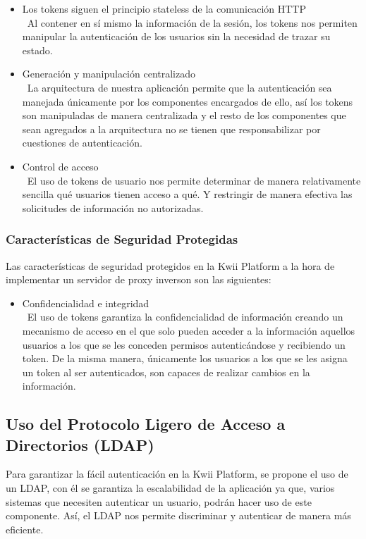 \begin{itemize}
    \item Los tokens siguen el principio stateless de la comunicación HTTP\\\
    Al contener en sí mismo la información de la sesión, los tokens nos permiten manipular la autenticación de los usuarios sin la necesidad de trazar su estado.
    \item Generación y manipulación centralizado\\\
    La arquitectura de nuestra aplicación permite que la autenticación sea manejada únicamente por los componentes encargados de ello, así los tokens son manipuladas de manera centralizada y el resto de los componentes que sean agregados a la arquitectura no se tienen que responsabilizar por cuestiones de autenticación.
    \item Control de acceso\\\
    El uso de tokens de usuario nos permite determinar de manera relativamente sencilla qué usuarios tienen acceso a qué. Y restringir de manera efectiva las solicitudes de información no autorizadas.
\end{itemize}

\subsubsection{Características de Seguridad Protegidas}
Las características de seguridad protegidos en la Kwii Platform a la hora de implementar un servidor de proxy inverson son las siguientes:
\begin{itemize}
    \item Confidencialidad e integridad\\\
    El uso de tokens garantiza la confidencialidad de información creando un mecanismo de acceso en el que solo pueden acceder a la información aquellos usuarios a los que se les conceden permisos autenticándose y recibiendo un token. De la misma manera, únicamente los usuarios a los que se les asigna un token al ser autenticados, son capaces de realizar cambios en la información.
\end{itemize}

\subsection{Uso del Protocolo Ligero de Acceso a Directorios (LDAP)}

Para garantizar la fácil autenticación en la Kwii Platform, se propone el uso de un LDAP, con él se garantiza la escalabilidad de la aplicación ya que, varios sistemas que necesiten autenticar un usuario, podrán hacer uso de este componente. Así, el LDAP nos permite discriminar y autenticar de manera más eficiente.

